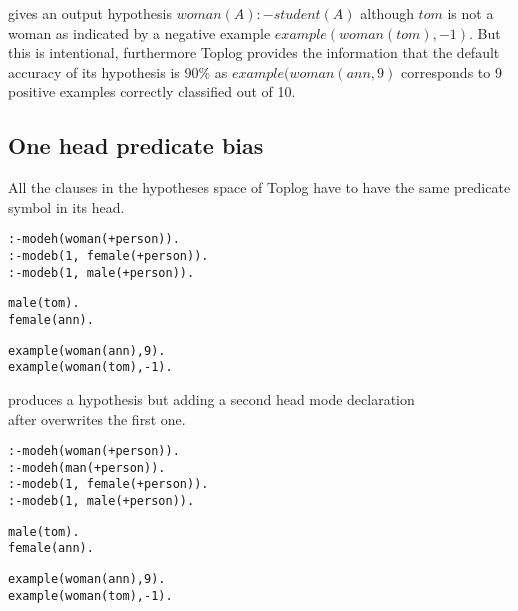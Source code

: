gives an output hypothesis $woman(A) :- student(A)$ although $tom$ is not a woman as indicated by a negative example $example(woman(tom),-1)$.
But this is intentional, furthermore Toplog provides the information that the default accuracy of its hypothesis is 90\% as $example(woman(ann,9)$ corresponds to 9 positive examples correctly classified out of 10.

\subsection{One head predicate bias}
All the clauses in the hypotheses space of Toplog have to have the same predicate symbol in its head.

\begin{minipage}[t]{.40\textwidth}
\begin{lstlisting}
:-modeh(woman(+person)).
:-modeb(1, female(+person)).
:-modeb(1, male(+person)).
\end{lstlisting}
\end{minipage}
\begin{minipage}[t]{.20\textwidth}
\begin{lstlisting}
male(tom).
female(ann).
\end{lstlisting}
\end{minipage}
\begin{minipage}[t]{.20\textwidth}
\begin{lstlisting}
example(woman(ann),9).
example(woman(tom),-1).
\end{lstlisting}
\end{minipage}

produces a hypothesis  but adding a second
head mode declaration \\
 after  overwrites the first one.

\begin{minipage}[t]{.40\textwidth}
\begin{lstlisting}
:-modeh(woman(+person)).
:-modeh(man(+person)).
:-modeb(1, female(+person)).
:-modeb(1, male(+person)).
\end{lstlisting}
\end{minipage}
\begin{minipage}[t]{.20\textwidth}
\begin{lstlisting}
male(tom).
female(ann).
\end{lstlisting}
\end{minipage}
\begin{minipage}[t]{.20\textwidth}
\begin{lstlisting}
example(woman(ann),9).
example(woman(tom),-1).
\end{lstlisting}
\end{minipage}

